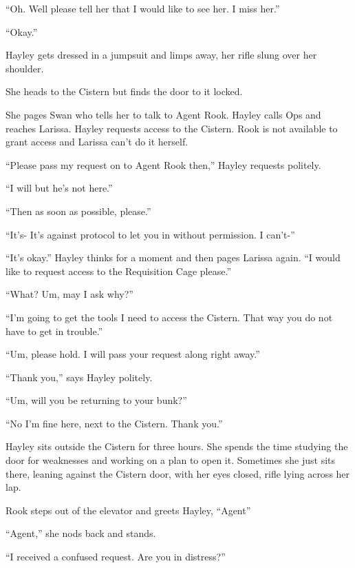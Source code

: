 ``Oh.  Well please tell her that I would like to see her.  I miss her.''

``Okay.''

Hayley gets dressed in a jumpsuit and limps away, her rifle slung over her shoulder.





She heads to the Cistern but finds the door to it locked.



She pages Swan who tells her to talk to Agent Rook.  Hayley calls Ops and reaches Larissa.  Hayley requests access to the Cistern.  Rook is not available to grant access and Larissa can't do it herself.  

``Please pass my request on to Agent Rook then,'' Hayley requests politely.

``I will but he's not here.''

``Then as soon as possible, please.''

``It's- It's against protocol to let you in without permission.  I can't-''

``It's okay.''  Hayley thinks for a moment and then pages Larissa again.  ``I would like to request access to the Requisition Cage please.''

``What?  Um, may I ask why?''

``I'm going to get the tools I need to access the Cistern.  That way you do not have to get in trouble.''

``Um, please hold.  I will pass your request along right away.''

``Thank you,'' says Hayley politely.

``Um, will you be returning to your bunk?''

``No I'm fine here, next to the Cistern.  Thank you.''



Hayley sits outside the Cistern for three hours.  She spends the time studying the door for weaknesses and working on a plan to open it.  Sometimes she just sits there, leaning against the Cistern door, with her eyes closed, rifle lying across her lap.



Rook steps out of the elevator and greets Hayley, ``Agent''

``Agent,'' she nods back and stands.

``I received a confused request.  Are you in distress?''


